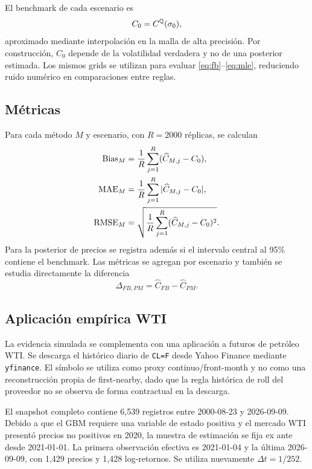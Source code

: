El benchmark de cada escenario es
\begin{equation}
 C_0=C^{\mathbb{Q}}(\sigma_0),
 \label{eq:trueprice}
\end{equation}
aproximado mediante interpolación en la malla de alta precisión. Por construcción, $C_0$ depende de la volatilidad verdadera y no de una posterior estimada. Los mismos grids se utilizan para evaluar \eqref{eq:fb}--\eqref{eq:mle}, reduciendo ruido numérico en comparaciones entre reglas.

\subsection{Métricas}

Para cada método $M$ y escenario, con $R=2000$ réplicas, se calculan
\begin{align}
 \operatorname{Bias}_M
 &=\frac1R\sum_{j=1}^{R}(\widehat C_{M,j}-C_0),\\
 \operatorname{MAE}_M
 &=\frac1R\sum_{j=1}^{R}|\widehat C_{M,j}-C_0|,\\
 \operatorname{RMSE}_M
 &=\sqrt{\frac1R\sum_{j=1}^{R}(\widehat C_{M,j}-C_0)^2}.
\end{align}
Para la posterior de precios se registra además si el intervalo central al 95\% contiene el benchmark. Las métricas se agregan por escenario y también se estudia directamente la diferencia
\begin{equation}
 \Delta_{FB,PM}=\widehat C_{FB}-\widehat C_{PM}.
 \label{eq:gap}
\end{equation}

\subsection{Aplicación empírica WTI}

La evidencia simulada se complementa con una aplicación a futuros de petróleo WTI. Se descarga el histórico diario de \texttt{CL=F} desde Yahoo Finance mediante \texttt{yfinance}. El símbolo se utiliza como proxy continuo/front-month y no como una reconstrucción propia de first-nearby, dado que la regla histórica de roll del proveedor no se observa de forma contractual en la descarga.

El snapshot completo contiene 6,539 registros entre 2000-08-23 y 2026-09-09. Debido a que el GBM requiere una variable de estado positiva y el mercado WTI presentó precios no positivos en 2020, la muestra de estimación se fija ex ante desde 2021-01-01. La primera observación efectiva es 2021-01-04 y la última 2026-09-09, con 1,429 precios y 1,428 log-retornos. Se utiliza nuevamente $\Delta t=1/252$.

